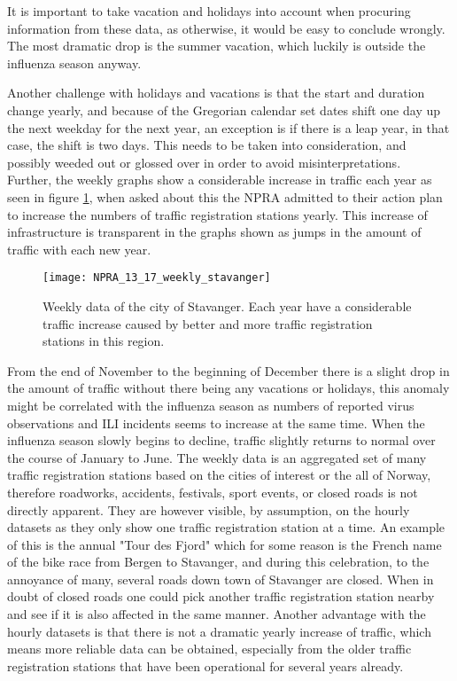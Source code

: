 It is important to take vacation and holidays into account when procuring information from these data, as otherwise, it would be easy to conclude wrongly. The most dramatic drop is the summer vacation, which luckily is outside the influenza season anyway. 

\newpage

Another challenge with holidays and vacations is that the start and duration change yearly, and because of the Gregorian calendar set dates shift one day up the next weekday for the next year, an exception is if there is a leap year, in that case, the shift is two days. This needs to be taken into consideration, and possibly weeded out or glossed over in order to avoid misinterpretations.
\\
Further, the weekly graphs show a considerable increase in traffic each year as seen in figure \ref{fig:weeklystavanger}, when asked about this the NPRA admitted to their action plan to increase the numbers of traffic registration stations yearly. This increase of infrastructure is transparent in the graphs shown as jumps in the amount of traffic with each new year. 

\begin{figure}[!htb]
\texttt{[image: NPRA\_13\_17\_weekly\_stavanger]}
\centering
\caption{Weekly data of the city of Stavanger. Each year have a considerable traffic increase caused by better and more traffic registration stations in this region.}
\label{fig:weeklystavanger}
\end{figure}

From the end of November to the beginning of December there is a slight drop in the amount of traffic without there being any vacations or holidays, this anomaly might be correlated with the influenza season as numbers of reported virus observations and ILI incidents seems to increase at the same time. When the influenza season slowly begins to decline, traffic slightly returns to normal over the course of January to June. The weekly data is an aggregated set of many traffic registration stations based on the cities of interest or the all of Norway, therefore roadworks, accidents, festivals, sport events, or closed roads is not directly apparent. They are however visible, by assumption, on the hourly datasets as they only show one traffic registration station at a time. An example of this is the annual "Tour des Fjord" which for some reason is the French name of the bike race from Bergen to Stavanger, and during this celebration, to the annoyance of many, several roads down town of Stavanger are closed. When in doubt of closed roads one could pick another traffic registration station nearby and see if it is also affected in the same manner. Another advantage with the hourly datasets is that there is not a dramatic yearly increase of traffic, which means more reliable data can be obtained, especially from the older traffic registration stations that have been operational for several years already.






